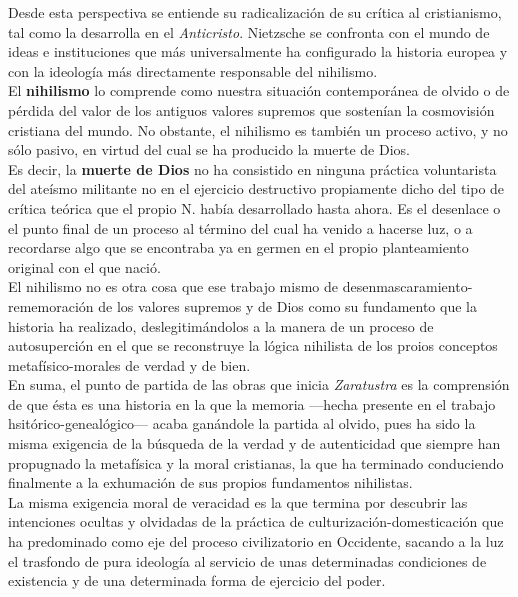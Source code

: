 \documentclass[a4paper, 10pt, twocolumn, spanish]{article}
\begin{document}
Desde esta perspectiva se entiende su radicalización de su crítica al
cristianismo, tal como la desarrolla en el \emph{Anticristo}. Nietzsche se
confronta con el mundo de ideas e instituciones que más universalmente
ha configurado la historia europea y con la ideología más directamente
responsable del nihilismo.\\[0pt]

El \textbf{nihilismo} lo comprende como nuestra situación contemporánea de
olvido o de pérdida del valor de los antiguos valores supremos que
sostenían la cosmovisión cristiana del mundo. No obstante, el
nihilismo es también un proceso activo, y no sólo pasivo, en virtud
del cual se ha producido la muerte de Dios.\\[0pt]

Es decir, la \textbf{muerte de Dios} no ha consistido en ninguna práctica
voluntarista del ateísmo militante no en el ejercicio destructivo
propiamente dicho del tipo de crítica teórica que el propio N. había
desarrollado hasta ahora. Es el desenlace o el punto final de un
proceso al término del cual ha venido a hacerse luz, o a recordarse
algo que se encontraba ya en germen en el propio planteamiento
original con el que nació.\\[0pt]
El nihilismo no es otra cosa que ese trabajo mismo de
desenmascaramiento-rememoración de los valores supremos y de Dios como
su fundamento que la historia ha realizado, deslegitimándolos a la
manera de un proceso de autosuperción en el que se reconstruye la
lógica nihilista de los proios conceptos metafísico-morales de verdad
y de bien.\\[0pt]

En suma, el punto de partida de las obras que inicia \emph{Zaratustra} es
la comprensión de que ésta es una historia en la que la memoria —hecha
presente en el trabajo hsitórico-genealógico— acaba ganándole la
partida al olvido, pues ha sido la misma exigencia de la búsqueda de
la verdad y de autenticidad que siempre han propugnado la metafísica y
la moral cristianas, la que ha terminado conduciendo finalmente a la
exhumación de sus propios fundamentos nihilistas.\\[0pt]
La misma exigencia moral de veracidad es la que termina por descubrir
las intenciones ocultas y olvidadas de la práctica de
culturización-domesticación que ha predominado como eje del proceso
civilizatorio en Occidente, sacando a la luz el trasfondo de pura
ideología al servicio de unas determinadas condiciones de existencia y
de una determinada forma de ejercicio del poder.\\[0pt]
\end{document}
